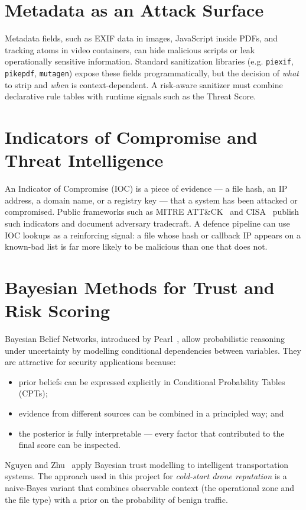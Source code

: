 \documentclass[12pt, a4paper]{report}
\begin{document}
\section{Metadata as an Attack Surface}

Metadata fields, such as EXIF data in images, JavaScript inside PDFs, and
tracking atoms in video containers, can hide malicious scripts or leak
operationally sensitive information. Standard sanitization libraries (e.g.
\texttt{piexif}, \texttt{pikepdf}, \texttt{mutagen}) expose these fields
programmatically, but the decision of \emph{what} to strip and \emph{when}
is context-dependent. A risk-aware sanitizer must combine declarative rule
tables with runtime signals such as the Threat Score.

\section{Indicators of Compromise and Threat Intelligence}

An Indicator of Compromise (IOC) is a piece of evidence --- a file hash, an
IP address, a domain name, or a registry key --- that a system has been
attacked or compromised. Public frameworks such as
MITRE ATT\&CK~\cite{mitre_attack} and CISA~\cite{cisa_iocs} publish such
indicators and document adversary tradecraft. A defence pipeline can use
IOC lookups as a reinforcing signal: a file whose hash or callback IP
appears on a known-bad list is far more likely to be malicious than one
that does not.

\section{Bayesian Methods for Trust and Risk Scoring}

Bayesian Belief Networks, introduced by Pearl~\cite{pearl1988bayesian},
allow probabilistic reasoning under uncertainty by modelling conditional
dependencies between variables. They are attractive for security
applications because:
\begin{itemize}
    \item prior beliefs can be expressed explicitly in Conditional
          Probability Tables (CPTs);
    \item evidence from different sources can be combined in a principled
          way; and
    \item the posterior is fully interpretable --- every factor that
          contributed to the final score can be inspected.
\end{itemize}
Nguyen and Zhu~\cite{nguyen2021bayesian} apply Bayesian trust modelling to
intelligent transportation systems. The approach used in this project for
\emph{cold-start drone reputation} is a naive-Bayes variant that combines
observable context (the operational zone and the file type) with a prior
on the probability of benign traffic.
\end{document}

